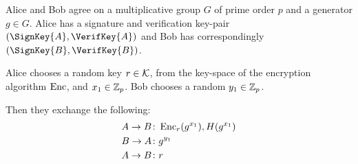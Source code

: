 \begin{protocol}\label{prot:otrinit}
  Alice and Bob agree on a multiplicative group \(G\) of prime order \(p\) and 
  a generator \(g\in G\).
  Alice has a signature and verification key-pair \((\SignKey{A}, 
    \VerifKey{A})\) and Bob has correspondingly \((\SignKey{B}, 
    \VerifKey{B})\).

  Alice chooses a random key \(r\in \mathcal K\), from the key-space of the encryption 
  algorithm \(\operatorname{\mathrm{Enc}}\), and \(x_1\in \mathbb Z_p\).
  Bob chooses a random \(y_1\in \mathbb Z_p\).
  \begin{frame}
  Then they exchange the following:
  \begin{align*}
    A\to B &\colon \operatorname{\mathrm{Enc}}_r( g^{x_1} ), H( g^{x_1} ) \\
    B\to A &\colon g^{y_1} \\
    A\to B &\colon r
  \end{align*}
  \end{frame}


\end{protocol}

